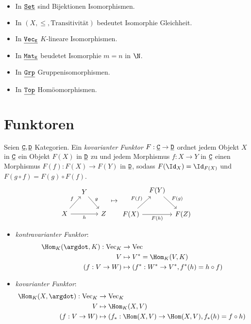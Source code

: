 \begin{ex}
	\begin{itemize}
		\item
			In $\underline{\mathtt{Set}}$ sind Bijektionen Isomorphismen.
		\item
			In $(X, \le, \text{Transitivität})$ bedeutet Isomorphie Gleichheit.
		\item
			In $\underline{\mathtt{Vec_K}}$ $K$-lineare Isomorphismen.
		\item
			In $\underline{\mathtt{Mat_K}}$ beudetet Isomorphie $m = n$ in $\N$.
		\item
			In $\underline{\mathtt{Grp}}$ Gruppenisomorphismen.
		\item
			In $\underline{\mathtt{Top}}$ Homöomorphismen.
	\end{itemize}
\end{ex}


\section{Funktoren}


\begin{df}
	Seien $\underline{\mathtt{C}}, \underline{\mathtt{D}}$ Kategorien.
	Ein \emph{kovarianter Funktor} $F: \underline{\mathtt{C}} \to \underline{\mathtt{D}}$ ordnet jedem Objekt $X$ in $\underline{\mathtt{C}}$ ein Objekt $F(X)$ in $\underline{\mathtt{D}}$ zu und jedem Morphismus $f: X \to Y$ in $\underline{\mathtt{C}}$ einen Morphismus $F(f) : F(X) \to F(Y)$ in $\underline{\mathtt{D}}$, sodass $F(\Id_X) = \Id_{F(X)}$ und $F(g\circ f) = F(g) \circ F(f)$.
	\[
		\begin{tikzcd}[column sep=small]
			~ & Y \arrow{dr}{g} & \\
			X \arrow{ur}{f} \arrow{rr}[swap]{h} & & Z
		\end{tikzcd}
		\mapsto
		\begin{tikzcd}[column sep=tiny]
			~ & F(Y) \arrow{dr}{F(g)} & \\
			F(X) \arrow{ur}{F(f)} \arrow{rr}[swap]{F(h)} & & F(Z)
		\end{tikzcd}
	\]
\end{df}

\begin{ex}
	\begin{itemize}
		\item
			\emph{kontravarianter Funktor}:
			\begin{align*}
				\Hom_K(\argdot, K): \Vec_K &\to \Vec \\
				V &\mapsto V^* = \Hom_K(V,K) \\
				(f: V \to W) &\mapsto (f^*: W^* \to V^*, f^*(h) = h \circ f)
			\end{align*}
		\item
			\emph{kovarianter Funktor}:
			\begin{align*}
				\Hom_K(X, \argdot) : \Vec_K &\to \Vec_K \\
				V & \mapsto \Hom_K(X, V) \\
				(f: V \to W) & \mapsto (f_*: \Hom(X, V) \to \Hom(X, V), f_*(h) = f \circ h)
			\end{align*}
	\end{itemize}
\end{ex}


